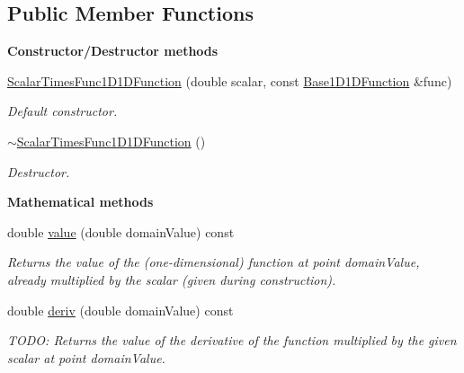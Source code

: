 \subsection*{Public Member Functions}
\begin{Indent}{\bf Constructor/\-Destructor methods}\par
\begin{DoxyCompactItemize}
\item 
\hyperlink{class_q_u_e_s_o_1_1_scalar_times_func1_d1_d_function_a8c70bff103932b5907b8f43c080d5af2}{Scalar\-Times\-Func1\-D1\-D\-Function} (double scalar, const \hyperlink{class_q_u_e_s_o_1_1_base1_d1_d_function}{Base1\-D1\-D\-Function} \&func)
\begin{DoxyCompactList}\small\item\em Default constructor. \end{DoxyCompactList}\item 
\hyperlink{class_q_u_e_s_o_1_1_scalar_times_func1_d1_d_function_a2775892943455ed641bcbc6b336a0865}{$\sim$\-Scalar\-Times\-Func1\-D1\-D\-Function} ()
\begin{DoxyCompactList}\small\item\em Destructor. \end{DoxyCompactList}\end{DoxyCompactItemize}
\end{Indent}
\begin{Indent}{\bf Mathematical methods}\par
\begin{DoxyCompactItemize}
\item 
double \hyperlink{class_q_u_e_s_o_1_1_scalar_times_func1_d1_d_function_af3ff65dedf376a0acde1df1f70fdfd51}{value} (double domain\-Value) const 
\begin{DoxyCompactList}\small\item\em Returns the value of the (one-\/dimensional) function at point {\ttfamily domain\-Value}, already multiplied by the scalar (given during construction). \end{DoxyCompactList}\item 
double \hyperlink{class_q_u_e_s_o_1_1_scalar_times_func1_d1_d_function_a60d05664b27b5b40cb31d38dc61c74ee}{deriv} (double domain\-Value) const 
\begin{DoxyCompactList}\small\item\em T\-O\-D\-O\-: Returns the value of the derivative of the function multiplied by the given scalar at point {\ttfamily domain\-Value}. \end{DoxyCompactList}\end{DoxyCompactItemize}
\end{Indent}
